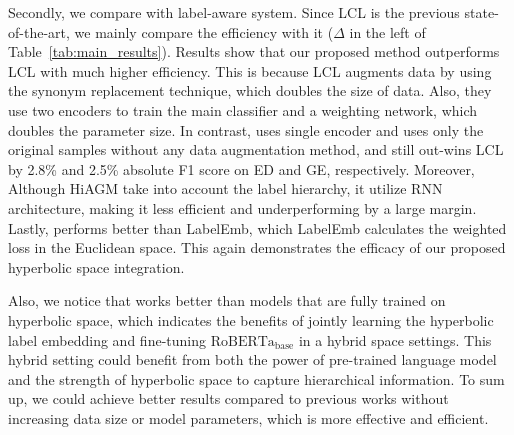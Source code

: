 Secondly, we compare with label-aware system. Since LCL is the previous state-of-the-art, we mainly compare the efficiency with it ($\Delta$ in the left of Table~\ref{tab:main_results}). Results show that our proposed method outperforms LCL with much higher efficiency. This is because LCL augments data by using the synonym replacement technique, which doubles the size of data. Also, they use two encoders to train the main classifier and a weighting network, which doubles the parameter size. In contrast, \wsmodelname uses single encoder and uses only the original samples without any data augmentation method, and still out-wins LCL by 2.8\% and 2.5\% absolute F1 score on ED and GE, respectively. 
Moreover, Although HiAGM take into account the label hierarchy, it utilize RNN architecture, making it less efficient and underperforming \wsmodelname by a large margin.
Lastly, \wsmodelname performs better than LabelEmb, which LabelEmb calculates the weighted loss in the Euclidean space. This again demonstrates the efficacy of our proposed hyperbolic space integration. 

Also, we notice that \wsmodelname works better than models that are fully trained on hyperbolic space, which indicates the benefits of jointly learning the hyperbolic label embedding and fine-tuning $\mathrm{RoBERTa}_\mathrm{base}$ in a hybrid space settings. This hybrid setting could benefit from both the power of pre-trained language model and the strength of hyperbolic space to capture hierarchical information. To sum up, we could achieve better results compared to previous works without increasing data size or model parameters, which is more effective and efficient.  

